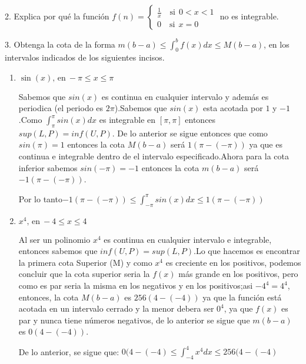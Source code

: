 \documentclass[12pt]{article}
\begin{document}
2. Explica por qu\'e la funci\'on
\(f(n)=
\begin{cases}
    \displaystyle\frac{1}{x} \quad \text{si} \ \ 0<x<1\\
    0 \quad \text{si} \ \ x=0
\end{cases}
\) no es integrable.

3. Obtenga la cota de la forma \(m(b-a) \leq \displaystyle\int_{0}^{b}f(x)dx \leq M(b-a)\), en los intervalos indicados de los siguientes incisos.

\begin{enumerate}[\hspace{9px} a)]
    \item \(\sin(x) \text{, en} \ -\pi \leq x \leq \pi\)\medskip

    Sabemos que $sin(x)$ es continua en cualquier intervalo y además es periodica (el periodo es $2\pi$).Sabemos que $sin(x)$ esta acotada por $1$ y $-1$.Como $\int_{\pi}^{\pi}sin(x)dx$ es integrable en $[\pi,\pi]$ entonces $sup{(L,P)}=inf{(U,P)}$. De lo anterior se sigue entonces que como $sin(\pi)=1$ entonces la cota $M(b-a)$ será $1(\pi-(-\pi))$ ya que es continua e integrable dentro de el intervalo especificado.Ahora para la cota inferior sabemos $sin(-\pi)=-1$ entonces la cota $m(b-a)$ será \(-1(\pi-(-\pi))\).
     \medskip

    Por lo tanto\(-1(\pi-(-\pi)) \leq \int_{-\pi}^{\pi}sin(x)dx \leq 1(\pi-(-\pi))\)
    \item \(x^4 \text{, en} \ -4 \leq x \leq 4\)\medskip

    Al ser un polinomio $x^4$ es continua en cualquier intervalo e integrable, entonces sabemos que $inf(U,P)=sup(L,P)$.Lo que hacemos es encontrar la primera cota Superior (M) y como $x^4$ es creciente en los positivos, podemos concluir que la cota superior seria la $f(x)$ más grande en los positivos, pero como es par seria la misma en los negativos y en los positivos;asi \(-4^4=4^4\), entonces, la cota $M(b-a)$ es $256(4-(-4))$ ya que la función está acotada en un intervalo cerrado y la menor debera ser \(0^4\), ya que $f(x)$ es par y nunca tiene números negativos, de lo anterior se sigue que $m(b-a)$ es $0(4-(-4))$.\medskip

    De lo anterior, se sigue que:\medskip
    \(0(4-(-4) \leq \int_{-4}^{4}x^4dx \leq 256(4-(-4)\) \medskip


\end{enumerate}
\end{document}
